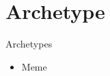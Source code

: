 \section{Archetype}

\begin{frame}{Archetypes}

    \begin{itemize}
        \item Meme

    \end{itemize}
\end{frame}
